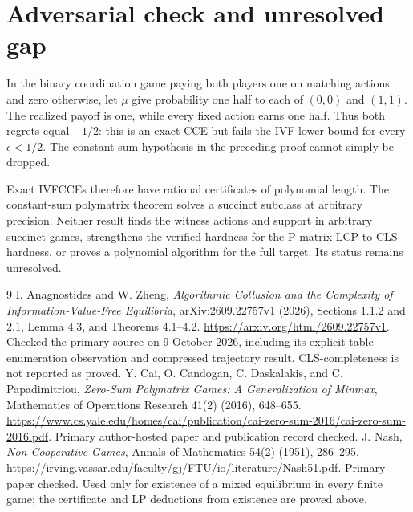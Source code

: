 \documentclass[11pt]{article}
\theoremstyle{definition}
\begin{document}
\section*{Adversarial check and unresolved gap}
In the binary coordination game paying both players one on matching actions and zero otherwise, let $\mu$ give probability one half to each of $(0,0)$ and $(1,1)$. The realized payoff is one, while every fixed action earns one half. Thus both regrets equal $-1/2$: this is an exact CCE but fails the IVF lower bound for every $\epsilon<1/2$. The constant-sum hypothesis in the preceding proof cannot simply be dropped.

Exact IVFCCEs therefore have rational certificates of polynomial length. The constant-sum polymatrix theorem solves a succinct subclass at arbitrary precision. Neither result finds the witness actions and support in arbitrary succinct games, strengthens the verified hardness for the P-matrix LCP to CLS-hardness, or proves a polynomial algorithm for the full target. Its status remains unresolved.

\begin{thebibliography}{9}
 I. Anagnostides and W. Zheng, \emph{Algorithmic Collusion and the Complexity of Information-Value-Free Equilibria}, arXiv:2609.22757v1 (2026), Sections 1.1.2 and 2.1, Lemma 4.3, and Theorems 4.1--4.2. \url{https://arxiv.org/html/2609.22757v1}. Checked the primary source on 9 October 2026, including its explicit-table enumeration observation and compressed trajectory result. CLS-completeness is not reported as proved.
 Y. Cai, O. Candogan, C. Daskalakis, and C. Papadimitriou, \emph{Zero-Sum Polymatrix Games: A Generalization of Minmax}, Mathematics of Operations Research 41(2) (2016), 648--655. \url{https://www.cs.yale.edu/homes/cai/publication/cai-zero-sum-2016/cai-zero-sum-2016.pdf}. Primary author-hosted paper and publication record checked.
 J. Nash, \emph{Non-Cooperative Games}, Annals of Mathematics 54(2) (1951), 286--295. \url{https://irving.vassar.edu/faculty/gj/FTU/io/literature/Nash51.pdf}. Primary paper checked. Used only for existence of a mixed equilibrium in every finite game; the certificate and LP deductions from existence are proved above.
\end{thebibliography}
\end{document}
